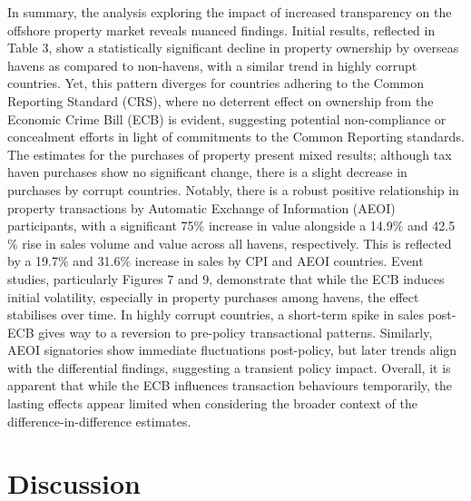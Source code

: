 \documentclass{article}
\begin{document}
In summary, the analysis exploring the impact of increased transparency on the offshore property market reveals nuanced findings. Initial results, reflected in Table 3, show a statistically significant decline in property ownership by overseas havens as compared to non-havens, with a similar trend in highly corrupt countries. Yet, this pattern diverges for countries adhering to the Common Reporting Standard (CRS), where no deterrent effect on ownership from the Economic Crime Bill (ECB) is evident, suggesting potential non-compliance or concealment efforts in light of commitments to the Common Reporting standards. The estimates for the purchases of property present mixed results; although tax haven purchases show no significant change, there is a slight decrease in purchases by corrupt countries. Notably, there is a robust positive relationship in property transactions by Automatic Exchange of Information (AEOI) participants, with a significant 75${\%}$ increase in value alongside a 14.9${\%}$ and 42.5${\%}$ rise in sales volume and value across all havens, respectively. This is reflected by a 19.7${\%}$ and 31.6${\%}$ increase in sales by CPI and AEOI countries. Event studies, particularly Figures 7 and 9, demonstrate that while the ECB induces initial volatility, especially in property purchases among havens, the effect stabilises over time. In highly corrupt countries, a short-term spike in sales post-ECB gives way to a reversion to pre-policy transactional patterns. Similarly, AEOI signatories show immediate fluctuations post-policy, but later trends align with the differential findings, suggesting a transient policy impact. Overall, it is apparent that while the ECB influences transaction behaviours temporarily, the lasting effects appear limited when considering the broader context of the difference-in-difference estimates.

\section{Discussion}
\end{document}
